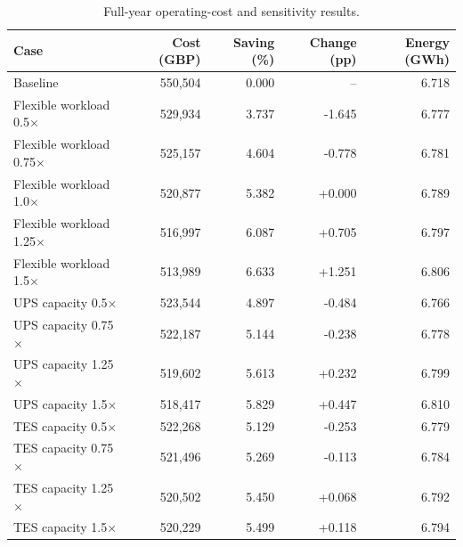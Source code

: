 \begin{table}[!t]
\centering
\caption{Full-year operating-cost and sensitivity results.}
\label{tab:annual-endpoints}
\begin{tabular}{lrrrr}
\toprule
Case & Cost (GBP) & Saving (\%) & Change (pp) & Energy (GWh) \\
\midrule
Baseline & 550,504 & 0.000 & -- & 6.718 \\
Flexible workload 0.5$\times$ & 529,934 & 3.737 & -1.645 & 6.777 \\
Flexible workload 0.75$\times$ & 525,157 & 4.604 & -0.778 & 6.781 \\
Flexible workload 1.0$\times$ & 520,877 & 5.382 & +0.000 & 6.789 \\
Flexible workload 1.25$\times$ & 516,997 & 6.087 & +0.705 & 6.797 \\
Flexible workload 1.5$\times$ & 513,989 & 6.633 & +1.251 & 6.806 \\
UPS capacity 0.5$\times$ & 523,544 & 4.897 & -0.484 & 6.766 \\
UPS capacity 0.75$\times$ & 522,187 & 5.144 & -0.238 & 6.778 \\
UPS capacity 1.25$\times$ & 519,602 & 5.613 & +0.232 & 6.799 \\
UPS capacity 1.5$\times$ & 518,417 & 5.829 & +0.447 & 6.810 \\
TES capacity 0.5$\times$ & 522,268 & 5.129 & -0.253 & 6.779 \\
TES capacity 0.75$\times$ & 521,496 & 5.269 & -0.113 & 6.784 \\
TES capacity 1.25$\times$ & 520,502 & 5.450 & +0.068 & 6.792 \\
TES capacity 1.5$\times$ & 520,229 & 5.499 & +0.118 & 6.794 \\
\bottomrule
\end{tabular}
\end{table}
